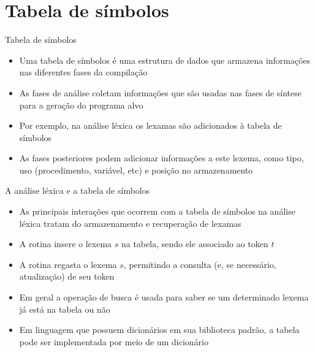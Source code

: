 \section{Tabela de símbolos}

\begin{frame}[fragile]{Tabela de símbolos}

    \begin{itemize}
        \item Uma tabela de símbolos é uma estrutura de dados que armazena informações nas diferentes fases da compilação
        \pause

        \item As fases de análise coletam informações que são usadas nas fases de síntese para a geração do programa alvo
        \pause

        \item Por exemplo, na análise léxica os lexamas são adicionados à tabela de símbolos
        \pause

        \item As fases posteriores podem adicionar informações a este lexema, como tipo, uso (procedimento, variável, etc) e posição no armazenamento
    \end{itemize}

\end{frame}

\begin{frame}[fragile]{A análise léxica e a tabela de símbolos}

    \begin{itemize}
        \item As principais interações que ocorrem com a tabela de símbolos na análise léxica tratam do armazenamento e recuperação de lexamas
        \pause

        \item A rotina  insere o lexema $s$ na tabela, sendo ele associado ao token $t$
        \pause

        \item A rotina  regasta o lexema $s$, permitindo a consulta (e, se necessário, atualização) de seu token
        \pause

        \item Em geral a operação de busca é usada para saber se um determinado lexema já está na tabela ou não
        \pause

        \item Em linguagem que possuem dicionários em sua biblioteca padrão, a tabela pode ser implementada por meio de um dicionário
    \end{itemize}

\end{frame}


